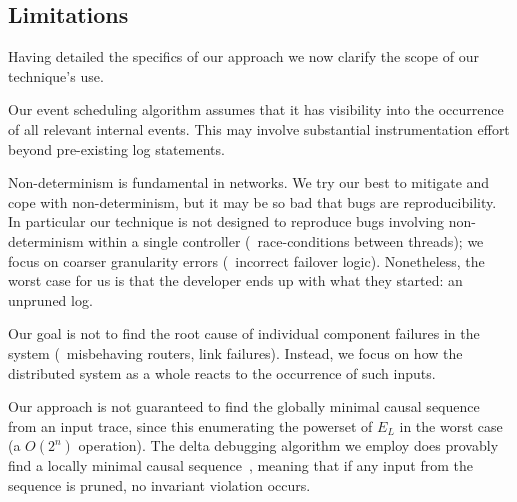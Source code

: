 \subsection{Limitations}
\label{subsec:non_goals}

Having detailed the specifics of our approach we now
clarify the scope of our technique's use.

 Our event scheduling algorithm assumes that
it has visibility into the occurrence of all relevant internal events. This
may involve substantial instrumentation effort beyond
pre-existing log statements.

 Non-determinism
is fundamental in networks. We try our best to mitigate and cope with
non-determinism, but it may be so bad that bugs are reproducibility. In
particular our technique is not designed to reproduce bugs
involving non-determinism within a single controller (\eg~race-conditions between threads);
we focus on coarser granularity errors (\eg~incorrect failover logic). Nonetheless, the
worst case for us is that the developer ends up with what they started:
an unpruned log.




 Our goal is not to find the root
cause of individual component failures in the system (\eg~misbehaving routers,
link failures). Instead, we focus on
how the distributed system as a whole reacts to the occurrence of such inputs.

Our approach is not guaranteed to find the globally minimal
causal sequence from an input trace, since this enumerating the powerset of
$E_L$ in the worst case (a $O(2^n)$ operation).
The delta debugging algorithm we employ does provably find a
locally minimal causal sequence~\cite{Zeller:1999:YMP:318773.318946},
meaning that if any input from the sequence is pruned, no invariant violation
occurs.

